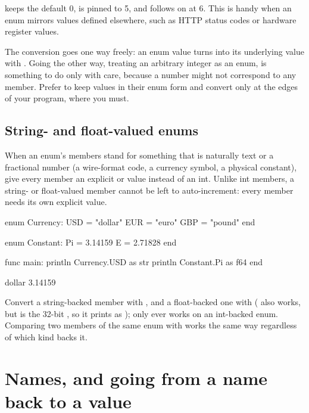  keeps the default 0,  is pinned to 5, and 
follows on at 6. This is handy when an enum mirrors values defined elsewhere, such
as HTTP status codes or hardware register values.

\begin{warn}
The conversion goes one way freely: an enum value turns into its underlying
value with . Going the other way, treating an arbitrary integer as an
enum, is something to do only with care, because a number might not correspond
to any member. Prefer to keep values in their enum form and convert only at the
edges of your program, where you must.
\end{warn}

\subsection{String- and float-valued enums}

When an enum's members stand for something that is naturally text or a
fractional number (a wire-format code, a currency symbol, a physical constant),
give every member an explicit  or  value instead of an
int. Unlike int members, a string- or float-valued member cannot be left to
auto-increment: every member needs its own explicit value.

\begin{salamen}
enum Currency:
    USD = "dollar"
    EUR = "euro"
    GBP = "pound"
end

enum Constant:
    Pi = 3.14159
    E = 2.71828
end

func main:
    println Currency.USD as str
    println Constant.Pi as f64
end
\end{salamen}

\begin{progout}
dollar
3.14159
\end{progout}

Convert a string-backed member with , and a float-backed one with
 ( also works, but  is the 32-bit
, so it prints as );  only ever works on an
int-backed enum. Comparing two members of the same enum with \code{==} works
the same way regardless of which kind backs it.

\section{Names, and going from a name back to a value}

